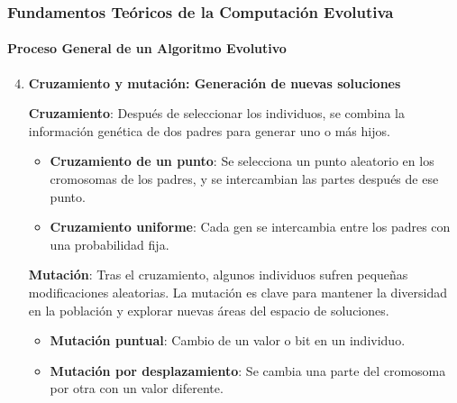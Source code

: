 \documentclass[
	11pt, %
]{beamer}
\begin{document}
\begin{frame}
    \frametitle{Fundamentos Teóricos de la Computación Evolutiva}
    \framesubtitle{Proceso General de un Algoritmo Evolutivo}
    \begin{enumerate}
    \setcounter{enumi}{3}
        \item \textbf{Cruzamiento y mutación: Generación de nuevas soluciones}
        
        \textbf{Cruzamiento}: Después de seleccionar los individuos, se combina la información genética de dos padres para generar uno o más hijos.
        
        \begin{itemize}
            \item \textbf{Cruzamiento de un punto}: Se selecciona un punto aleatorio en los cromosomas de los padres, y se intercambian las partes después de ese punto.
            \item \textbf{Cruzamiento uniforme}: Cada gen se intercambia entre los padres con una probabilidad fija.
        \end{itemize}
        
        \textbf{Mutación}: Tras el cruzamiento, algunos individuos sufren pequeñas modificaciones aleatorias. La mutación es clave para mantener la diversidad en la población y explorar nuevas áreas del espacio de soluciones.
        
        \begin{itemize}
            \item \textbf{Mutación puntual}: Cambio de un valor o bit en un individuo.
            \item \textbf{Mutación por desplazamiento}: Se cambia una parte del cromosoma por otra con un valor diferente.
        \end{itemize}
    \end{enumerate}
\end{frame}
\end{document}

